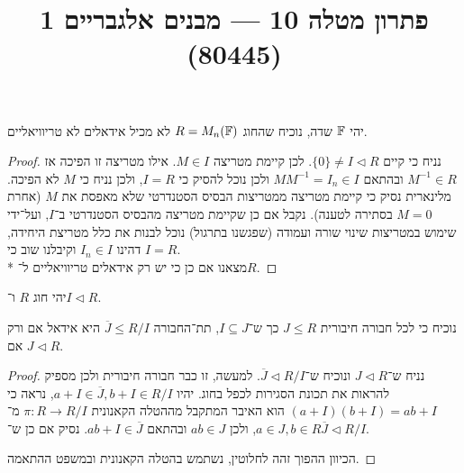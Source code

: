 
\title{פתרון מטלה 10 --- מבנים אלגבריים 1 (80445)}


\maketitle
\maketitleprint{}

\Question{}
יהי $\mathbb{F}$ שדה, נוכיח שהחוג $R = M_n(\mathbb{F})$ לא מכיל אידאלים לא טריוויאליים.
\begin{proof}
	נניח כי קיים $\{ 0 \} \ne I \triangleleft R$.
	לכן קיימת מטריצה $M \in I$.
	אילו מטריצה זו הפיכה אז $M^{-1} \in R$ ובהתאם $M M^{-1} = I_n \in I$ ולכן נוכל להסיק כי $I = R$, ולכן נניח כי $M$ לא הפיכה.
	מלינארית נסיק כי קיימת מטריצה ממטריצות הבסיס הסטנדרטי שלא מאפסת את $M$ (אחרת $M = 0$ בסתירה לטענה).
	נקבל אם כן שקיימת מטריצה מהבסיס הסטנדרטי ב־$I$, ועל־ידי שימוש במטריצות שינוי שורה ועמודה (שפגשנו בתרגול) נוכל לבנות את כלל מטריצת היחידה, דהינו $I_n \in I$ וקיבלנו שוב כי $I = R$. \\*
	מצאנו אם כן כי יש רק אידאלים טריוויאליים ל־$R$.
\end{proof}

\Question{}
יהי חוג $R$ ו־$I \triangleleft R$.

\Subquestion{}
נוכיח כי לכל חבורה חיבורית $J \le R$ כך ש־$I \subseteq J$, תת־החבורה $\overline{J} \le R / I$ היא אידאל אם ורק אם $J \triangleleft R$.
\begin{proof}
	נניח ש־$J \triangleleft R$ ונוכיח ש־$\overline{J} \triangleleft R / I$.
	למעשה, זו כבר חבורה חיבורית ולכן מספיק להראות את תכונת הסגירות לכפל בחוג.
	יהיו $a + I \in \overline{J}, b + I \in R / I$, נראה כי $(a + I)(b + I) = ab + I$ הוא האיבר המתקבל מההטלה הקאנונית $\pi : R \to R / I$ מ־$a \in J, b \in R$, ולכן $ab \in J$ ובהתאם $ab + I \in \overline{J}$.
	נסיק אם כן ש־$\overline{J} \triangleleft R / I$.

	הכיוון ההפוך זהה לחלוטין, נשתמש בהטלה הקאנונית ובמשפט ההתאמה.
\end{proof}

